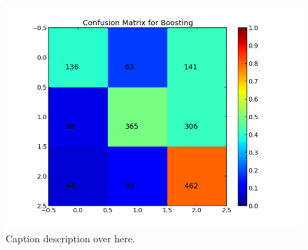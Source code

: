 \begin{figure}[H]
 \begin{center}
     \includegraphics[width=0.7\linewidth]{../img/plots/grid/confusion_matrix_Boosting.png}
 \end{center}
 \caption[Results overview across models]{Caption description over here.}
 \label{fig:confmat_boosting}
\end{figure}